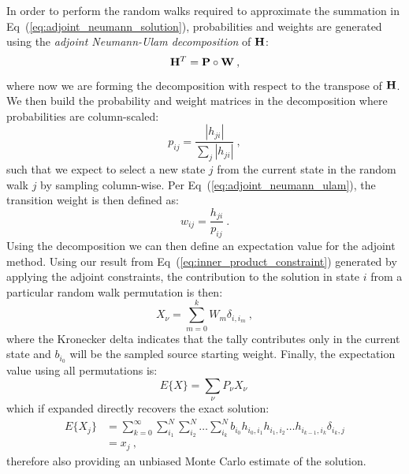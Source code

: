 \documentclass{mc2013}
\begin{document}
In order to perform the random walks required to approximate the
summation in Eq~(\ref{eq:adjoint_neumann_solution}), probabilities and
weights are generated using the \textit{adjoint Neumann-Ulam
  decomposition} of $\mathbf{H}$:
\begin{equation}
  \mathbf{H}^{T} = \mathbf{P} \circ \mathbf{W}\:,
  \label{eq:adjoint_neumann_ulam}
\end{equation}
where now we are forming the decomposition with respect to the
transpose of $\mathbf{H}$. We then build the probability and weight
matrices in the decomposition where probabilities are column-scaled:
\begin{equation}
  p_{ij} = \frac{|h_{ji}|}{\sum_j |h_{ji}|}\:,
  \label{eq:adjoint_probability}
\end{equation}
such that we expect to select a new state $j$ from the current state
in the random walk $j$ by sampling column-wise. Per
Eq~(\ref{eq:adjoint_neumann_ulam}), the transition weight is then
defined as:
\begin{equation}
  w_{ij} = \frac{h_{ji}}{p_{ij}}\:.
  \label{eq:adjoint_weight}
\end{equation}
Using the decomposition we can then define an expectation value for
the adjoint method. Using our result from
Eq~(\ref{eq:inner_product_constraint}) generated by applying the
adjoint constraints, the contribution to the solution in state $i$
from a particular random walk permutation is then:
\begin{equation}
  X_{\nu} = \sum_{m=0}^k W_{m} \delta_{i,i_m}\:,
  \label{eq:adjoint_permutation_contribution}
\end{equation}
where the Kronecker delta indicates that the tally contributes only in
the current state and $b_{i_0}$ will be the sampled source starting
weight. Finally, the expectation value using all permutations is:
\begin{equation}
  E\{X\} = \sum_{\nu} P_{\nu} X_{\nu}\:
  \label{eq:adjoint_expectation_value}
\end{equation}
which if expanded directly recovers the exact solution:
\begin{equation}
  \begin{split}
    E\{X_j\} &=\sum_{k=0}^{\infty}\sum_{i_1}^{N}\sum_{i_2}^{N}\ldots
    \sum_{i_k}^{N} b_{i_0} h_{i_0,i_1}h_{i_1,i_2}\ldots
    h_{i_{k-1},i_k} \delta_{i_k,j} \\ &= x_{j}\:,
  \end{split}
  \label{eq:adjoint_expectation_expansion}
\end{equation}
therefore also providing an unbiased Monte Carlo estimate of the
solution.
\end{document}
